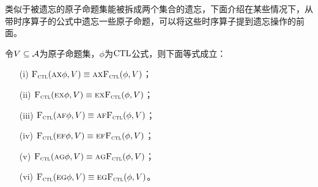 类似于被遗忘的原子命题集能被拆成两个集合的遗忘，下面介绍在某些情况下，从带时序算子的公式中遗忘一些原子命题，可以将这些时序算子提到遗忘操作的前面。
\begin{proposition}
	令$V\subseteq {\cal A}$为原子命题集，$\phi$为$\textrm{CTL}$公式，则下面等式成立：
	\begin{itemize}
		\item[(i)] ${\textsc{F}_{\textsc{ctl}}}(\textsc{a}\textsc{x}\phi,V) \equiv \textsc{a} \textsc{x}{\textsc{F}_{\textsc{ctl}}}(\phi,V)$；
		\item[(ii)] ${\textsc{F}_{\textsc{ctl}}}(\textsc{e}\textsc{x}\phi,V) \equiv \textsc{e} \textsc{x}{\textsc{F}_{\textsc{ctl}}}(\phi,V)$；
		\item[(iii)] ${\textsc{F}_{\textsc{ctl}}}(\textsc{a}\textsc{f}\phi,V) \equiv \textsc{a}\textsc{f}{\textsc{F}_{\textsc{ctl}}}(\phi,V)$；
		\item[(iv)] ${\textsc{F}_{\textsc{ctl}}}(\textsc{e}\textsc{f}\phi,V) \equiv \textsc{e}\textsc{f}{\textsc{F}_{\textsc{ctl}}}(\phi,V)$；
		\item[(v)] ${\textsc{F}_{\textsc{ctl}}}(\textsc{a} \textsc{g}\phi,V)\equiv \textsc{a} \textsc{g}{\textsc{F}_{\textsc{ctl}}}(\phi,V)$；
		\item[(vi)] ${\textsc{F}_{\textsc{ctl}}}(\textsc{e}\textsc{g}\phi,V)\equiv\textsc{e}\textsc{g} {\textsc{F}_{\textsc{ctl}}}(\phi,V)$。
	\end{itemize}
\end{proposition}
